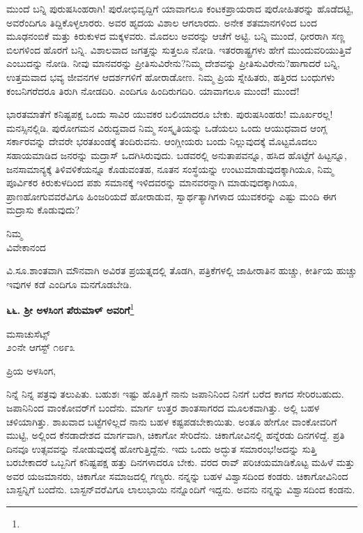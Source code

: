 ಮುಂದೆ ಬನ್ನಿ ಪುರುಷಸಿಂಹರಾಗಿ! ಪುರೋಭಿವೃದ್ದಿಗೆ ಯಾವಾಗಲೂ ಕಂಟಕಪ್ರಾಯರಾದ ಪುರೋಹಿತರನ್ನು ಹೊಡೆದಟ್ಟಿ, ಅವರೆಂದಿಗೂ ತಿದ್ದಿಕೊಳ್ಳಲಾರರು. ಅವರ ಹೃದಯ ವಿಶಾಲ ಆಗಲಾರದು. ಅನೇಕ ಶತಮಾನಗಳಿಂದ ಬಂದ ಮೂಢನಂಬಿಕೆ ಮತ್ತು ಕಿರುಕುಳದ ಮಕ್ಕಳವರು. ಮೊದಲು ಅವರನ್ನು ಆಚೆಗೆ ಅಟ್ಟಿ. ಬನ್ನಿ ಮುಂದೆ, ಧೀರರಾಗಿ ಸಣ್ಣ ಬಿಲಗಳಿಂದ ಹೊರಗೆ ಬನ್ನಿ. ವಿಶಾಲವಾದ ಜಗತ್ತನ್ನು ಸುತ್ತಲೂ ನೋಡಿ. ಇತರರಾಷ್ಟ್ರಗಳು ಹೇಗೆ ಮುಂದುವರಿಯುತ್ತಿವೆ ಎಂಬುದನ್ನು ನೋಡಿ. ನೀವು ಮಾನವರನ್ನು ಪ್ರೀತಿಸುವಿರೇನು?ನಿಮ್ಮ ದೇಶವನ್ನು ಪ್ರೀತಿಸುವಿರೇನು?ಹಾಗಾದರೆ ಬನ್ನಿ, ಉತ್ತಮವಾದ ಭವ್ಯ ಜೀವನಗಳ ಆದರ್ಶಗಳಿಗೆ ಹೋರಾಡೋಣ. ನಿಮ್ಮ ಪ್ರಿಯ ಸ್ನೇಹಿತರು, ಹತ್ತಿರದ ಬಂಧುಗಳು ಕಂಬನಿಗರೆದರೂ ತಿರುಗಿ ನೋಡದಿರಿ. ಎಂದಿಗೂ ಹಿಂದಿರುಗದಿರಿ. ಯಾವಾಗಲೂ ಮುಂದೆ! ಮುಂದೆ!

ಭಾರತಮಾತೆಗೆ ಕನಿಷ್ಟಪಕ್ಷ ಒಂದು ಸಾವಿರ ಯುವಕರ ಬಲಿಯಾದರೂ ಬೇಕು. ಪುರುಷಸಿಂಹರು! ಮೂರ್ಖರಲ್ಲ! ಮನಸ್ಸಿನಲ್ಲಿಡಿ. ಪುರೋಗಮನ ವಿರುದ್ದವಾದ ನಿಮ್ಮ ಸಂಸ್ಕೃತಿಯನ್ನು ಒಡೆಯಲು ಒಂದು ಆಯುಧವಾದ ಆಂಗ್ಲ ಸರ್ಕಾರವನ್ನು ದೇವರೇ ಭರತಖಂಡಕ್ಕೆ ತಂದಿರುವನು. ಆಂಗ್ಲೀಯರು ಬಂದು ನಿಲ್ಲುವುದಕ್ಕೆ ಮೊಟ್ಟಮೊದಲು ಸಹಾಯಮಾಡಿದ ಜನರನ್ನು ಮದ್ರಾಸ್ ಒದಗಿಸಿರುವುದು. ಬಡವರಲ್ಲಿ ಅನುತಾಪವನ್ನೂ, ಹಸಿದ ಹೊಟ್ಟೆಗೆ ಹಿಟ್ಟನ್ನೂ, ಜನಸಾಮಾನ್ಯಕ್ಕೆ ತಿಳಿವಳಿಕೆಯನ್ನೂ ಕೊಡುವಂತಹ, ನೂತನ ಸಂಸ್ಥೆಯನ್ನು ಉಂಟುಮಾಡುವುದಕ್ಕಾಗಿಯೂ, ನಿಮ್ಮ ಪೂರ್ವಿಕರ ಕಿರುಕುಳದಿಂದ ಪಶು ಸಮಾನಕ್ಕೆ ಇಳಿದವರನ್ನು ಮಾನವರನ್ನಾಗಿ ಮಾಡುವುದಕ್ಕಾಗಿಯೂ, ಪ್ರಾಣಹೋಗುವವರೆವಿಗೂ ಹಿಂಜರಿಯದೆ ಹೋರಾಡುವ, ಸ್ವಾರ್ಥತ್ಯಾಗಿಗಳಾದ ಯುವಕರನ್ನು ಎಷ್ಟು ಮಂದಿ ಈಗ ಮದ್ರಾಸು ಕೊಡುವುದು?

{\flushright
ನಿಮ್ಮ\\ವಿವೇಕಾನಂದ\par}

\smallskip

ವಿ.ಸೂ.\enginline{-}ಶಾಂತವಾಗಿ ಮೌನವಾಗಿ ಅವಿರತ ಪ್ರಯತ್ನದಲ್ಲಿ ತೊಡಗಿ, ಪತ್ರಿಕೆಗಳಲ್ಲಿ ಜಾಹೀರಾತಿನ ಹುಚ್ಚು, ಕೀರ್ತಿಯ ಹುಚ್ಚು ಇವುಗಳ ಕಡೆ ಎಂದಿಗೂ ಮನಗೊಡಬೇಡಿ.

\newpage

\begin{center}
\textbf{೬೬. ಶ‍್ರೀ ಅಳಸಿಂಗ ಪೆರುಮಾಳ್ ಅವರಿಗೆ}\footnote{}
\end{center}

\begin{flushright}
ಮಸಾಚುಸೆಟ್ಸ್\\೨೦ನೇ ಆಗಸ್ಟ್ ೧೮೯೩
\end{flushright}

\noindent
ಪ್ರಿಯ ಅಳಸಿಂಗ,

ನಿನ್ನೆ ನಿನ್ನ ಪತ್ರವು ತಲುಪಿತು. ಬಹುಶಃ ಇಷ್ಟು ಹೊತ್ತಿಗೆ ನಾನು ಜಪಾನಿನಿಂದ ನಿನಗೆ ಬರೆದ ಕಾಗದ ಸೇರಿರಬಹುದು. ಜಪಾನಿನಿಂದ ವಾಂಕೋವರ್‌ಗೆ ಬಂದೆನು. ಮಾರ್ಗ ಉತ್ತರ ಶಾಂತಸಾಗರದ ಮೂಲಕವಾಗಿತ್ತು. ಅಲ್ಲಿ ಬಹಳ ಚಳಿಯಾಗಿತ್ತು. ಶಾಖವಾದ ಬಟ್ಟೆಗಳಿಲ್ಲದೆ ನಾನು ಬಹಳ ಕಷ್ಟಪಡಬೇಕಾಯಿತು. ಅಂತೂ ಹೇಗೋ ವಾಂಕೋವರಿಗೆ ಮುಟ್ಟಿ, ಅಲ್ಲಿಂದ ಕೆನಡಾದೇಶದ ಮಾರ್ಗವಾಗಿ, ಚಿಕಾಗೋ ಸೇರಿದೆನು. ಚಿಕಾಗೋವಿನಲ್ಲಿ ಹನ್ನೆರಡು ದಿನಗಳಿದ್ದೆ. ಪ್ರತಿ ದಿನವೂ ಉತ್ಸವವನ್ನು ನೋಡುವುದಕ್ಕೆ ಹೋಗುತ್ತಿದ್ದೆನು. ಇದು ಒಂದು ಅದ್ಭುತ ಸಮಾರಂಭ!ಅದನ್ನು ಸುತ್ತಿ ಬರಬೇಕಾದರೆ ಒಬ್ಬನಿಗೆ ಕನಿಷ್ಟಪಕ್ಷ ಹತ್ತು ದಿನಗಳಾದರೂ ಬೇಕು. ವರದ ರಾವ್ ಪರಿಚಯಮಾಡಿಕೊಟ್ಟ ಮಹಿಳೆ ಮತ್ತು ಅವರ ಯಜಮಾನರು, ಚಿಕಾಗೋ ಸಮಾಜದಲ್ಲಿ ಗಣ್ಯರು. ನನ್ನನ್ನು ಬಹಳ ವಿಶ್ವಾಸದಿಂದ ಕಂಡರು. ಚಿಕಾಗೋವಿನಿಂದ ಬಾಸ್ಟನ್ನಿಗೆ ಬಂದೆನು. ಬಾಸ್ಟನ್‌ವರೆವಿಗೂ ಲಾಲುಭಾಯಿ ನನ್ನೊಂದಿಗೆ ಇದ್ದನು. ಅವನು ನನ್ನನ್ನು ವಿಶ್ವಾಸದಿಂದ ಕಂಡನು.


